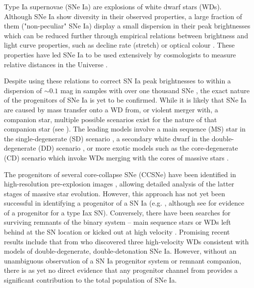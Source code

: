 \documentclass[fleqn,usenatbib]{mnras}
\providecommand{\DIFadd}[1]{\protect\cbstart{#1}\protect\cbend} %
\providecommand{\DIFdel}[1]{\protect\cbdelete} %
\providecommand{\DIFaddbegin}{} %
\providecommand{\DIFaddend}{} %
\providecommand{\DIFdelbegin}{} %
\providecommand{\DIFdelend}{} %
\newcommand{\DIFscaledelfig}{0.5}
\newlength{\DIFdelgraphicswidth} %
\newlength{\DIFdelgraphicsheight} %
\newcommand{\DIFaddincludegraphics}[2][]{{\color{blue}\fbox{\DIFOincludegraphics[#1]{#2}}}} %
\newcommand{\DIFdelincludegraphics}[2][]{%
\sbox{\DIFdelgraphicsbox}{\DIFOincludegraphics[#1]{#2}}%
\settoboxwidth{\DIFdelgraphicswidth}{\DIFdelgraphicsbox} %
\settoboxtotalheight{\DIFdelgraphicsheight}{\DIFdelgraphicsbox} %
\scalebox{\DIFscaledelfig}{%
\parbox[b]{\DIFdelgraphicswidth}{\usebox{\DIFdelgraphicsbox}\\[-\baselineskip] \rule{\DIFdelgraphicswidth}{0em}}\llap{\resizebox{\DIFdelgraphicswidth}{\DIFdelgraphicsheight}{%
\setlength{\unitlength}{\DIFdelgraphicswidth}%
\begin{picture}(1,1)%
\thicklines\linethickness{2pt} %
{\color[rgb]{1,0,0}\put(0,0){\framebox(1,1){}}}%
{\color[rgb]{1,0,0}\put(0,0){\line( 1,1){1}}}%
{\color[rgb]{1,0,0}\put(0,1){\line(1,-1){1}}}%
\end{picture}%
}\hspace*{3pt}}} %
} %
\DeclareRobustCommand{\DIFaddbegin}{\DIFOaddbegin \let\includegraphics\DIFaddincludegraphics} %
\DeclareRobustCommand{\DIFaddend}{\DIFOaddend \let\includegraphics\DIFOincludegraphics} %
\DeclareRobustCommand{\DIFdelbegin}{\DIFOdelbegin \let\includegraphics\DIFdelincludegraphics} %
\DeclareRobustCommand{\DIFdelend}{\DIFOaddend \let\includegraphics\DIFOincludegraphics} %
\begin{document}
Type Ia supernovae (SNe Ia) are explosions of white dwarf stars (WDs). Although SNe Ia show diversity in their observed properties, a large fraction of them ("non-peculiar" SNe Ia) display a small dispersion in their peak brightnesses which can be reduced further through empirical relations between brightness and light curve properties, such as decline rate (stretch) or optical colour \citep{Rust1974,Pskovskii1977,Phillips1993,Tripp1998}. These properties have led SNe Ia to be used extensively by cosmologists to measure relative distances in the Universe \citep{Riess1998,Perlmutter1999}.

Despite using these relations to correct SN Ia peak brightnesses to within a dispersion of $\sim 0.1$ mag in samples with over one thousand SNe \citep{Scolnic2018}, the exact nature of the progenitors of SNe Ia is yet to be confirmed. While it is likely that SNe Ia are caused by mass transfer onto a WD from, or violent merger with, a companion star, multiple possible scenarios exist for the nature of that companion star (see \DIFdelbegin \DIFdel{\citealt{Maoz2014} for a review}\DIFdelend \DIFaddbegin \DIFadd{\citealt{Maoz2014,Ruiter2020} for reviews}\DIFaddend ). The leading models involve a main sequence (MS) star in the single-degenerate (SD) scenario \citep{Whelan1973,Nomoto1982}, a secondary white dwarf in the double-degenerate (DD) scenario \citep{Tutukov1976,Iben1984,Webbink1984}, or more exotic models such as the core-degenerate (CD) scenario which invoke WDs merging with the cores of massive stars \DIFdelbegin \DIFdel{\citep{Soker2019}}\DIFdelend \DIFaddbegin \DIFadd{\citep{Kashi2011,Ilkov2011}}\DIFaddend . 

The progenitors of several core-collapse SNe (CCSNe) have been identified in high-resolution pre-explosion images \citep{Smartt2009,Eldridge2013}, allowing detailed analysis of the latter stages of massive star evolution. However, this approach has not yet been successful in identifying a progenitor of a SN Ia (e.g. \citealt{Graur2014a,Kelly2014,Graur2019}, although see \citet{McCully2014} for evidence of a progenitor for a type Iax SN). Conversely, there have been searches for surviving remnants of the binary system -- main sequence stars or WDs left behind at the SN location or kicked out at high velocity \citep[e.g.][]{Schaefer2012,Ruiz-Lapuente2018,Kerzendorf2018,Kerzendorf2019}. Promising recent results include that from \citet{Shen2018} who discovered three high-velocity WDs consistent with models of double-degenerate, double-detonation SNe Ia. However, without an unambiguous observation of a SN Ia progenitor system or remnant companion, there is as yet no direct evidence that any progenitor channel from provides a significant contribution to the total population of SNe Ia.
\end{document}
